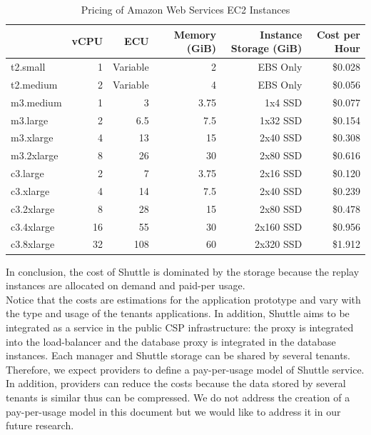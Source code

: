 \begin{table}
  \centering
   \begin{tabular}{|l|r|r|r|r|r|}
\hline
            & \bf{vCPU} & \bf{ECU}    & \bf{Memory (GiB)}  & \bf{Instance Storage (GiB)}  & \bf{Cost per Hour } \\ \hline
t2.small    & 1         & Variable    & 2                  & EBS Only                     & \$0.028            \\ \hline
t2.medium   & 2         & Variable    & 4                  & EBS Only                     & \$0.056            \\ \hline
m3.medium   & 1         & 3           & 3.75               & 1x4 SSD                      & \$0.077            \\ \hline
m3.large    & 2         & 6.5         & 7.5                & 1x32 SSD                     & \$0.154            \\ \hline
m3.xlarge   & 4         & 13          & 15                 & 2x40 SSD                     & \$0.308            \\ \hline
m3.2xlarge  & 8         & 26          & 30                 & 2x80 SSD                     & \$0.616            \\ \hline
c3.large    & 2         & 7           & 3.75               & 2x16 SSD                     & \$0.120            \\ \hline
c3.xlarge   & 4         & 14          & 7.5                & 2x40 SSD                     & \$0.239            \\ \hline
c3.2xlarge  & 8         & 28          & 15                 & 2x80 SSD                     & \$0.478            \\ \hline
c3.4xlarge  & 16        & 55          & 30                 & 2x160 SSD                    & \$0.956            \\ \hline
c3.8xlarge  & 32        & 108         & 60                 & 2x320 SSD                    & \$1.912            \\ \hline
\end{tabular}
\caption{Pricing of Amazon Web Services \ac{EC2} Instances }
\label{tab:ec2Cost}
\end{table}

In conclusion, the cost of Shuttle is dominated by the storage because the replay instances are allocated on demand and paid-per usage.\\

Notice that the costs are estimations for the application prototype and vary with the type and usage of the tenants applications. In addition, Shuttle aims to be integrated as a service in the public \acf{CSP} infrastructure: the proxy is integrated into the load-balancer and the database proxy is integrated in the database instances. Each manager and Shuttle storage can be shared by several tenants. Therefore, we expect providers to define a pay-per-usage model of Shuttle service. In addition, providers can reduce the costs because the data stored by several tenants is similar thus can be compressed. We do not address the creation of a pay-per-usage model in this document but we would like to address it in our future research.

